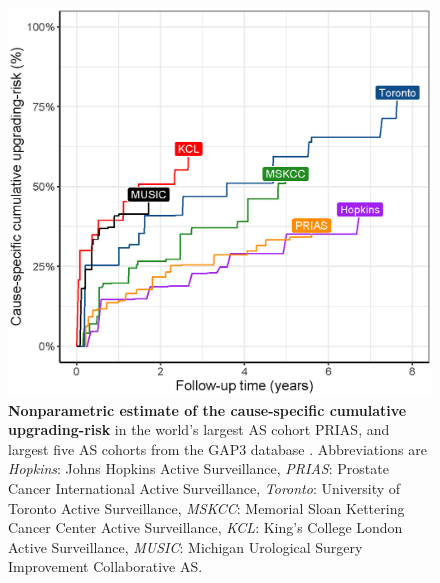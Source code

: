 \begin{figure}[!htb]
\centerline{\includegraphics[width=\columnwidth]{images/npmle_plot.eps}}
\caption{\textbf{Nonparametric estimate \citep{turnbull1976empirical} of the cause-specific cumulative upgrading-risk} in the world's largest AS cohort PRIAS, and largest five AS cohorts from the GAP3 database \citep{gap3_2018}. Abbreviations are \textit{Hopkins}: Johns Hopkins Active Surveillance, \textit{PRIAS}: Prostate Cancer International Active Surveillance, \textit{Toronto}: University of Toronto Active Surveillance, \textit{MSKCC}: Memorial Sloan Kettering Cancer Center Active Surveillance, \textit{KCL}: King's College London Active Surveillance, \textit{MUSIC}: Michigan Urological Surgery Improvement Collaborative AS.}
\label{fig:npmle_plot}
\end{figure}

